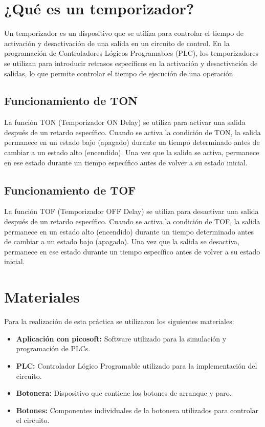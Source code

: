 \documentclass[12pt]{report}
\begin{document}
\section{¿Qué es un temporizador?}
Un temporizador es un dispositivo que se utiliza para controlar el tiempo de activación y desactivación de una salida en un circuito de control. En la programación de Controladores Lógicos Programables (PLC), los temporizadores se utilizan para introducir retrasos específicos en la activación y desactivación de salidas, lo que permite controlar el tiempo de ejecución de una operación.
\subsection{Funcionamiento de TON}
La función TON (Temporizador ON Delay) se utiliza para activar una salida después de un retardo específico. Cuando se activa la condición de TON, la salida permanece en un estado bajo (apagado) durante un tiempo determinado antes de cambiar a un estado alto (encendido). Una vez que la salida se activa, permanece en ese estado durante un tiempo específico antes de volver a su estado inicial.
\subsection{Funcionamiento de TOF}
La función TOF (Temporizador OFF Delay) se utiliza para desactivar una salida después de un retardo específico. Cuando se activa la condición de TOF, la salida permanece en un estado alto (encendido) durante un tiempo determinado antes de cambiar a un estado bajo (apagado). Una vez que la salida se desactiva, permanece en ese estado durante un tiempo específico antes de volver a su estado inicial.


\section{Materiales}
Para la realización de esta práctica se utilizaron los siguientes materiales:

\begin{itemize}
  \item \textbf{Aplicación con picosoft:} Software utilizado para la simulación y programación de PLCs.
  \item \textbf{PLC:} Controlador Lógico Programable utilizado para la implementación del circuito.
  \item \textbf{Botonera:} Dispositivo que contiene los botones de arranque y paro.
  \item \textbf{Botones:} Componentes individuales de la botonera utilizados para controlar el circuito.
\end{itemize}
\end{document}
